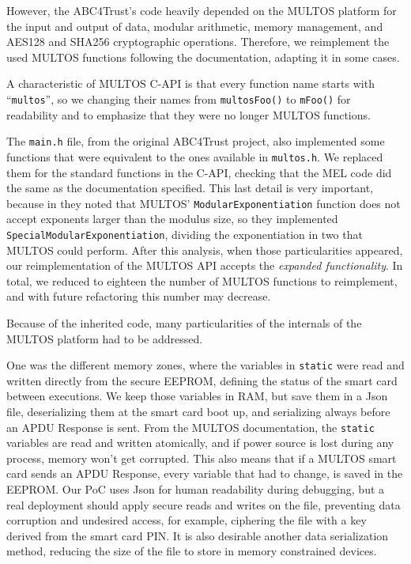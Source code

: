 However, the ABC4Trust's code heavily depended on the MULTOS platform for the input and output of data, modular arithmetic, memory management, and AES128 and SHA256 cryptographic operations. Therefore, we reimplement the used MULTOS functions following the documentation, adapting it in some cases.

A characteristic of MULTOS C-API is that every function name starts with ``\texttt{multos}'', so we changing their names from \texttt{multosFoo()} to \texttt{mFoo()} for readability and to emphasize that they were no longer MULTOS functions.

The \texttt{main.h} file, from the original ABC4Trust project, also implemented some functions that were equivalent to the ones available in \texttt{multos.h}. We replaced them for the standard functions in the C-API, checking that the MEL code did the same as the documentation specified. This last detail is very important, because in \citep{vullers2013efficient} they noted that MULTOS' \texttt{ModularExponentiation} function does not accept exponents larger than the modulus size, so they implemented \texttt{SpecialModularExponentiation}, dividing the exponentiation in two that MULTOS could perform. After this analysis, when those particularities appeared, our reimplementation of the MULTOS API accepts the \textit{expanded functionality}. In total, we reduced to eighteen the number of MULTOS functions to reimplement, and with future refactoring this number may decrease.

\hfil

Because of the inherited code, many particularities of the internals of the MULTOS platform had to be addressed. 

One was the different memory zones, where the variables in \texttt{static} were read and written directly from the secure EEPROM, defining the status of the smart card between executions. We keep those variables in RAM, but save them in a Json file, deserializing them at the smart card boot up, and serializing always before an APDU Response is sent. From the MULTOS documentation, the \texttt{static} variables are read and written atomically, and if power source is lost during any process, memory won't get corrupted. This also means that if a MULTOS smart card sends an APDU Response, every variable that had to change, is saved in the EEPROM. Our PoC uses Json for human readability during debugging, but a real deployment should apply secure reads and writes on the file, preventing data corruption and undesired access, for example, ciphering the file with a key derived from the smart card PIN. It is also desirable another data serialization method, reducing the size of the file to store in memory constrained devices.


